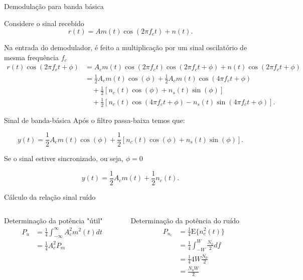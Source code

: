 \documentclass[aspectratio=169,dvipsnames]{beamer}
\begin{document}
\begin{frame}{Demodulação para banda básica}

Considere o sinal recebido
$$
r(t) = Am(t)\cos(2\pi f_c t) + n(t).
$$

Na entrada do demodulador, é feito a multiplicação por um sinal oscilatório de mesma frequência $f_c$
\begin{align*}
r(t) \cos(2\pi f_c t + \phi) &= A_c m(t) \cos(2\pi f_c t) \cos(2\pi f_c t + \phi) + n(t) \cos(2\pi f_c t + \phi) \\
&= \frac{1}{2} A_c m(t) \cos(\phi) + \frac{1}{2} A_c m(t) \cos(4\pi f_c t + \phi) \\
&\quad + \frac{1}{2} [n_c(t) \cos(\phi) + n_s(t) \sin(\phi)] \\
&\quad + \frac{1}{2} [n_c(t) \cos(4\pi f_c t + \phi) - n_s(t) \sin(4\pi f_c t + \phi)]. 
\end{align*}
\end{frame}


\begin{frame}{Sinal de banda-básica}
    Após o filtro passa-baixa temos que:

    $$
y(t) = \frac{1}{2} A_c m(t) \cos(\phi) + \frac{1}{2} [n_c(t) \cos(\phi) + n_s(t) \sin(\phi)].
$$

Se o sinal estiver sincronizado, ou seja, $\phi = 0$

$$
y(t) = \frac{1}{2} A_c m(t)  + \frac{1}{2} n_c(t).
$$

\end{frame}


\begin{frame}{Cálculo da relação sinal ruído}
\begin{columns}[T]
\begin{column}{0.5\textwidth}
Determinação da potência "útil"
\begin{align*}
    P_u &= \frac{1}{4}\int _{-\infty}^{\infty} A^2_c m^2(t) dt\\ 
        &= \frac{1}{4} A^2_c P_m
\end{align*}
\end{column}

\begin{column}{0.5\textwidth}
Determinação da potência do ruído
\begin{align*}
    P_{n_c} &= \frac{1}{4}\textrm{E}\{ n^2_c(t)\} \\
            &=  \frac{1}{4} \int _{-W}^{W} \frac{N_0}{2} df \\
            &=  \frac{1}{4} 4W \frac{N_0}{2} \\
            &= \frac{N_0W}{2}
\end{align*}
\end{column}
\end{columns}
\end{frame}
\end{document}
